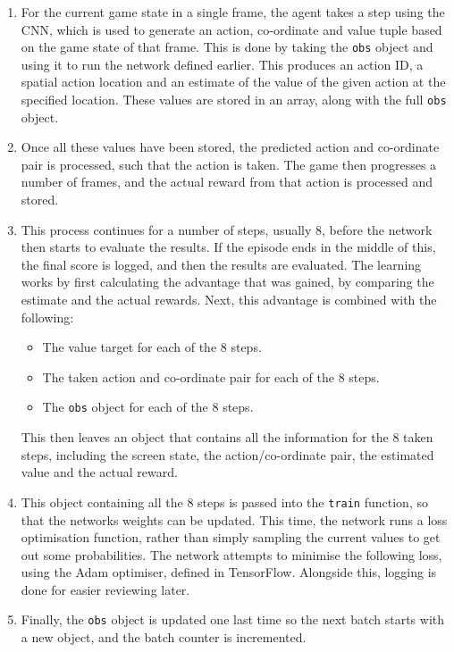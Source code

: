 \begin{enumerate}
    \item For the current game state in a single frame, the agent takes a step
        using the CNN, which is used to generate an action, co-ordinate and value
        tuple based on the game state of that frame. This is done by taking the
        \texttt{obs} object and using it to run the network defined earlier.
        This produces an action ID, a spatial action location and an estimate of
        the value of the given action at the specified location. These values
        are stored in an array, along with the full \texttt{obs} object.
    \item Once all these values have been stored, the predicted action and
        co-ordinate pair is processed, such that the action is taken. The game
        then progresses a number of frames, and the actual reward from that
        action is processed and stored.
    \item This process continues for a number of steps, usually 8, before the
        network then starts to evaluate the results. If the episode ends in the
        middle of this, the final score is logged, and then the results are
        evaluated. The learning works by first calculating the advantage that
        was gained, by comparing the estimate and the actual rewards. Next, this
        advantage is combined with the following:
        \begin{itemize}
            \item The value target for each of the 8 steps.
            \item The taken action and co-ordinate pair for each of the 8 steps.
            \item The \texttt{obs} object for each of the 8 steps.
        \end{itemize}
        This then leaves an object that contains all the information for the 8
        taken steps, including the screen state, the action/co-ordinate pair, the
        estimated value and the actual reward.
    \item This object containing all the 8 steps is passed into the
        \texttt{train} function, so that the networks weights can be updated.
        This time, the network runs a loss optimisation function, rather than
        simply sampling the current values to get out some probabilities. The
        network attempts to minimise the following loss, using the Adam
        optimiser, defined in TensorFlow.
        Alongside this, logging is done for easier reviewing later.
    \item Finally, the \texttt{obs} object is updated one last time so the next
        batch starts with a new object, and the batch counter is incremented.
\end{enumerate}

